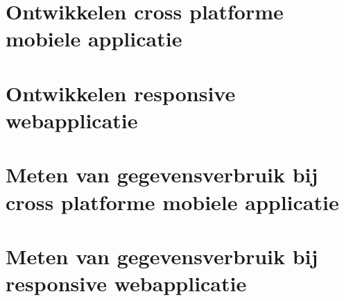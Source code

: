\section{Ontwikkelen cross platforme mobiele applicatie}
\section{Ontwikkelen responsive webapplicatie}
\section{Meten van gegevensverbruik bij cross platforme mobiele applicatie}
\section{Meten van gegevensverbruik bij responsive webapplicatie}
\lipsum[21-25]
